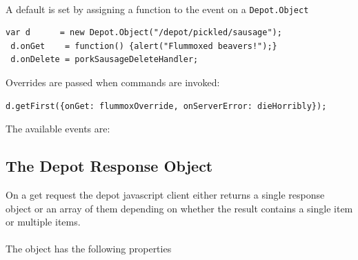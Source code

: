 \documentclass{report}
\begin{document}
\paragraph{}
A default is set by assigning a function to the event on a \texttt{Depot.Object}

\begin{Verbatim}[frame=single]
 var d      = new Depot.Object("/depot/pickled/sausage");
 d.onGet    = function() {alert("Flummoxed beavers!");}
 d.onDelete = porkSausageDeleteHandler;
\end{Verbatim}

Overrides are passed when commands are invoked: 
\begin{Verbatim}[frame=single]
 d.getFirst({onGet: flummoxOverride, onServerError: dieHorribly});
\end{Verbatim}

The available events are: 



\pagebreak
\subsection{The Depot Response Object}

On a get request the depot javascript client either returns a single
response object or an array of them depending on whether the result
contains a single item or multiple items.
\paragraph{}
The object has the following properties
\end{document}

